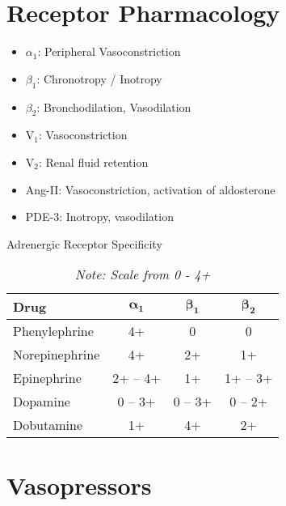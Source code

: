 \documentclass[main.tex]{subfiles}
\begin{document}
	
\begin{summarybox}
\end{summarybox}

\section{Receptor Pharmacology}
\begin{itemize}[noitemsep]
	\item $\alpha_1$: Peripheral Vasoconstriction
	\item $\beta_1$: Chronotropy / Inotropy
	\item $\beta_2$: Bronchodilation, Vasodilation
	\item V$_1$: Vasoconstriction
	\item V$_2$: Renal fluid retention
	\item Ang-II: Vasoconstriction, activation of aldosterone
	\item PDE-3: Inotropy, vasodilation
\end{itemize}


\begin{table}[h]
\centering
\caption{Adrenergic Receptor Specificity\autocite{jentzerPharmacotherapyUpdateUse2015b}}
\label{tab:adrenergic-receptor-specificity}
\begin{tabular}{l c c c}
	\textbf{Drug} & $\mathbf{\alpha_1}$ & $\mathbf{\beta_1}$ & $\mathbf{\beta_2}$\\ \hline
	Phenylephrine & 4+ & 0 & 0 \\
	Norepinephrine & 4+ & 2+ & 1+ \\
	Epinephrine & 2+ -- 4+ & 1+ & 1+ -- 3+ \\
	Dopamine & 0 -- 3+ & 0 -- 3+ & 0 -- 2+ \\
	Dobutamine & 1+ & 4+ & 2+ \\
\end{tabular}
\caption*{\small \textit{Note: Scale from 0 - 4+}}
\end{table}


\section{Vasopressors}
\end{document}
